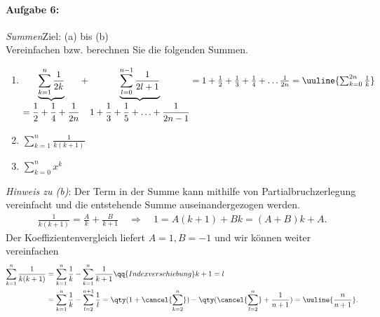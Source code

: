 
\paragraph{Aufgabe 6: } \emph{Summen}\hfill Ziel: (a) bis (b)\\[0.2cm]
Vereinfachen bzw. berechnen Sie die folgenden Summen. 

\begin{enumerate}[label=(\alph*), labelindent=1em,labelsep=0.5cm]
    \item $\underbrace{\sum_{k=1}^n \frac{1}{2k}}_{\displaystyle =\frac{1}{2}+\frac{1}{4} + \frac{1}{2n}} + \underbrace{\sum_{l=0}^{n-1} \frac{1}{2l+1}}_{\displaystyle 1+\frac{1}{3}+\frac{1}{5}+\hdots+\frac{1}{2n-1}} = 1 + \frac{1}{2} + \frac{1}{3} + \frac{1}{4} + \hdots \frac{1}{2n} = \uuline{\sum_{k=0}^{2n} \frac{1}{k}}$
    \item $\sum_{k=1}^n \frac{1}{k(k+1)}$
    \item $\sum_{k=0}^n x^k$ 
\end{enumerate}

\emph{Hinweis zu (b)}: Der Term in der Summe kann mithilfe von Partialbruchzerlegung vereinfacht und die entstehende Summe auseinandergezogen werden. 
\begin{align*}
    \frac{1}{k(k+1)} = \frac{A}{k} + \frac{B}{k+1} \quad \Rightarrow \quad 1 = A(k+1) + Bk = (A+B) k + A.
\end{align*}
Der Koeffizientenvergleich liefert $A=1, B=-1$ und wir können weiter vereinfachen 
\begin{align*}
    \sum_{k=1}^n \frac{1}{k(k+1)} &= \sum_{k=1}^n \frac{1}{k} - \sum_{k=1}^n \frac{1}{k+1} \qq{Indexverschiebung} k+1 = l \\
    & =\sum_{k=1}^n \frac{1}{k} - \sum_{l=2}^{n+1} \frac{1}{l} = \qty(1 + \cancel{\sum_{k=2}^n}) - \qty(\cancel{\sum_{l=2}^n} + \frac{1}{n+1}) = \uuline{\frac{n}{n+1}}.
\end{align*}

